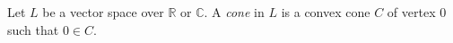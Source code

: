 Let $L$ be a vector space over $\mathbb{R}$ or $\mathbb{C}$. A \emph{cone} in $L$ is a convex cone $C$ of vertex $0$ such that $0 \in C$.

